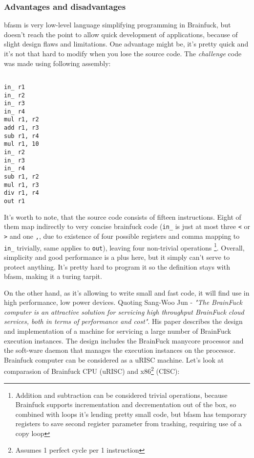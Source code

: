 \documentclass{article}
\begin{document}
\subsubsection{Advantages and disadvantages}
\par bfasm is very low-level language simplifying programming in Brainfuck, but doesn't reach the point to allow quick development of applications, because of slight design flaws and limitations. One advantage might be, it's pretty quick and it's not that hard to modify when you lose the source code. The \textit{challenge} code was made using following assembly:

\begin{verbatim}

in_ r1
in_ r2
in_ r3
in_ r4
mul r1, r2
add r1, r3
sub r1, r4
mul r1, 10
in_ r2
in_ r3
in_ r4
sub r1, r2
mul r1, r3
div r1, r4
out r1

\end{verbatim}

\par It's worth to note, that the source code consists of fifteen instructions. Eight of them map indirectly to very concise brainfuck code (\verb|in_| is just at most three \verb|<| or \verb|>| and one \verb|,|, due to existence of four possible registers and comma mapping to \verb|in_| trivially, same applies to \verb|out|), leaving four non-trivial operations \footnote{Addition and subtraction can be considered trivial operations, because Brainfuck supports incrementation and decrementation out of the box, so combined with loops it's lending pretty small code, but bfasm has temporary registers to save second register parameter from trashing, requiring use of a copy loop}. Overall, simplicity and good performance is a plus here, but it simply can't serve to protect anything. It's pretty hard to program it so the definition stays with bfasm, making it a turing tarpit.

\par On the other hand, as it's allowing to write small and fast code, it will find use in high performance, low power devices. Quoting Sang-Woo Jun - \textit{"The BrainFuck computer is an attractive solution for servicing high throughput BrainFuck cloud services, both in terms of performance and cost"}. His paper describes the design and implementation of a machine for servicing a large number of BrainFuck execution instances. The design  includes  the  BrainFuck  manycore  processor  and  the  soft-ware daemon that manages the execution instances on the processor. Brainfuck computer can be considered as a uRISC machine. Let's look at comparasion of Brainfuck CPU (uRISC) and x86\footnote{Assumes 1 perfect cycle per 1 instruction} (CISC):
\end{document}
